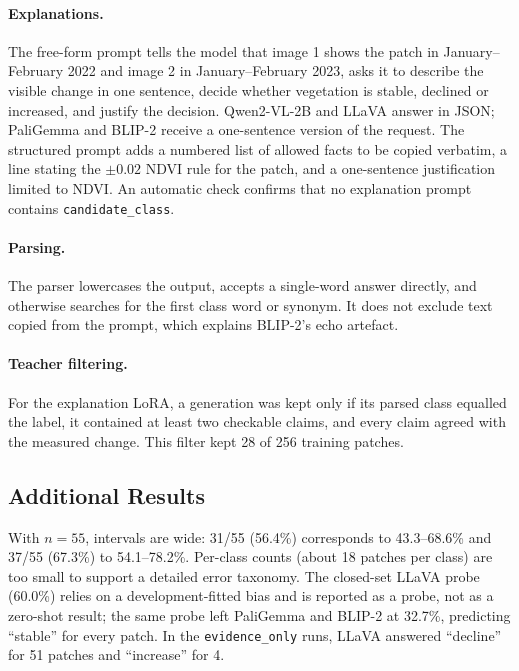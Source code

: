 \documentclass[11pt]{article}
\begin{document}
\paragraph{Explanations.} The free-form prompt tells the model that
image 1 shows the patch in January--February 2022 and image 2 in
January--February 2023, asks it to describe the visible change in one
sentence, decide whether vegetation is stable, declined or increased,
and justify the decision. Qwen2-VL-2B and LLaVA answer in JSON;
PaliGemma and BLIP-2 receive a one-sentence version of the request.
The structured prompt adds a numbered list of allowed facts to be copied verbatim, a line stating
the $\pm 0.02$ NDVI rule for the patch, and a one-sentence justification
limited to NDVI. An automatic check confirms that no explanation prompt
contains \texttt{candidate\_class}.

\paragraph{Parsing.} The parser lowercases the output, accepts a
single-word answer directly, and otherwise searches for the first class
word or synonym. It does not exclude text copied from the prompt, which
explains BLIP-2's echo artefact.

\paragraph{Teacher filtering.} For the explanation LoRA, a generation
was kept only if its parsed class equalled the label, it contained at
least two checkable claims, and every claim agreed with the measured
change. This filter kept 28 of 256 training patches.

\subsection{Additional Results}

With $n = 55$, intervals are wide: 31/55 (56.4\%) corresponds to
43.3--68.6\% and 37/55 (67.3\%) to 54.1--78.2\%. Per-class counts
(about 18 patches per class) are too small to support a detailed error
taxonomy. The closed-set LLaVA probe (60.0\%) relies on a
development-fitted bias and is reported as a probe, not as a zero-shot
result; the same probe left PaliGemma and BLIP-2 at 32.7\%, predicting
``stable'' for every patch. In the \texttt{evidence\_only} runs, LLaVA
answered ``decline'' for 51 patches and ``increase'' for 4.
\end{document}
